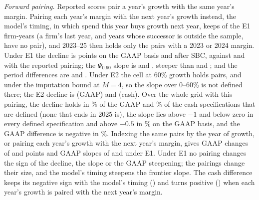 \emph{Forward pairing.} Reported scores pair a year's growth with the same year's margin. Pairing each year's margin with the next year's growth instead, the model's timing, in which spend this year buys growth next year, keeps \ScFwdNEone{} of the \VNEone{} E1 firm-years (a firm's last year, and years whose successor is outside the sample, have no pair), and 2023--25 then holds only the \ScFwdLateNEone{} pairs with a 2023 or 2024 margin. Under E1 the decline is \ScFwdTopOpEone{} points on the GAAP basis and \ScFwdTopCashEone{} after SBC, against \ScTopOpBase{} and \ScTopCashBase{} with the reported pairing; the $\Psi_{0.90}$ slope is \ScFwdPsiOpEone{} and \ScFwdPsiCashEone, steeper than \PsiOpEone{} and \PsiCashEone; and the period differences are \ScFwdDiffOpEone{} and \ScFwdDiffCashEone. Under E2 the cell at 60\% growth holds \ScFwdCellEtwo{} pairs, and \ScFwdCellImpFour{} under the imputation bound at $M=4$, so the slope over 0--60\% is not defined there; the E2 decline is \ScFwdTopOpEtwo{} (GAAP) and \ScFwdTopCashEtwo{} (cash). Over the whole grid with this pairing, the decline holds in \ScFGTopOpShare\% of the \ScFGTopOpN{} GAAP and \ScFGTopCashShare\% of the \ScFGTopCashN{} cash specifications that are defined (none that ends in 2025 is), the slope lies above $-1$ and below zero in every defined specification and above $-0.5$ in \ScFGPsiOpShareHalf\% on the GAAP basis, and the GAAP difference is negative in \ScFGDiffOpShare\%. Indexing the same pairs by the year of growth, or pairing each year's growth with the next year's margin, gives GAAP changes of \ScFwdNextTopOpEone{} and \ScLagTopOpEone{} points and GAAP slopes of \ScFwdNextPsiOpEone{} and \ScLagPsiOpEone{} under E1. Under E1 no pairing changes the sign of the decline, the slope or the GAAP steepening; the pairings change their size, and the model's timing steepens the frontier slope. The cash difference keeps its negative sign with the model's timing (\ScFwdDiffCashEone) and turns positive (\ScLagDiffCashEone) when each year's growth is paired with the next year's margin.

